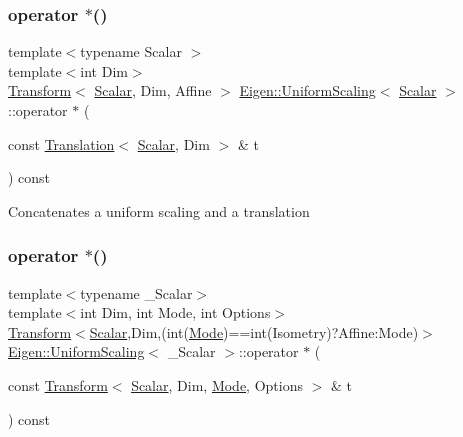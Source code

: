 \subsubsection{\texorpdfstring{operator $\ast$()}{operator *()}\hspace{0.1cm}{\footnotesize\ttfamily [2/4]}}
{\footnotesize\ttfamily template$<$typename Scalar $>$ \\
template$<$int Dim$>$ \\
\mbox{\hyperlink{class_eigen_1_1_transform}{Transform}}$<$ \mbox{\hyperlink{class_eigen_1_1_uniform_scaling_a04c4339f58f1210c5d4d34b1bd7ae283}{Scalar}}, Dim, Affine $>$ \mbox{\hyperlink{class_eigen_1_1_uniform_scaling}{Eigen\+::\+Uniform\+Scaling}}$<$ \mbox{\hyperlink{class_eigen_1_1_uniform_scaling_a04c4339f58f1210c5d4d34b1bd7ae283}{Scalar}} $>$\+::operator $\ast$ (\begin{DoxyParamCaption}\item[{const \mbox{\hyperlink{class_eigen_1_1_translation}{Translation}}$<$ \mbox{\hyperlink{class_eigen_1_1_uniform_scaling_a04c4339f58f1210c5d4d34b1bd7ae283}{Scalar}}, Dim $>$ \&}]{t }\end{DoxyParamCaption}) const\hspace{0.3cm}{\ttfamily [inline]}}

Concatenates a uniform scaling and a translation \mbox{\label{class_eigen_1_1_uniform_scaling_a7756799d406f099c7ba5b198a59d4497}} 
\subsubsection{\texorpdfstring{operator $\ast$()}{operator *()}\hspace{0.1cm}{\footnotesize\ttfamily [3/4]}}
{\footnotesize\ttfamily template$<$typename \+\_\+\+Scalar$>$ \\
template$<$int Dim, int Mode, int Options$>$ \\
\mbox{\hyperlink{class_eigen_1_1_transform}{Transform}}$<$\mbox{\hyperlink{class_eigen_1_1_uniform_scaling_a04c4339f58f1210c5d4d34b1bd7ae283}{Scalar}},Dim,(int(\mbox{\hyperlink{struct_mode}{Mode}})==int(Isometry)?Affine\+:\+Mode)$>$ \mbox{\hyperlink{class_eigen_1_1_uniform_scaling}{Eigen\+::\+Uniform\+Scaling}}$<$ \+\_\+\+Scalar $>$\+::operator $\ast$ (\begin{DoxyParamCaption}\item[{const \mbox{\hyperlink{class_eigen_1_1_transform}{Transform}}$<$ \mbox{\hyperlink{class_eigen_1_1_uniform_scaling_a04c4339f58f1210c5d4d34b1bd7ae283}{Scalar}}, Dim, \mbox{\hyperlink{struct_mode}{Mode}}, Options $>$ \&}]{t }\end{DoxyParamCaption}) const\hspace{0.3cm}{\ttfamily [inline]}}

